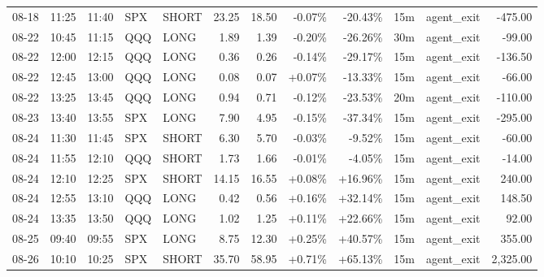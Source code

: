 \documentclass[11pt,a4paper]{article}
\begin{document}
\begin{center}
\begin{longtable}{>{\color{txtmain}}l l l l l r r r r r >{\color{txtmain}}l r}
08-18 & 11:25 & 11:40 & SPX & SHORT & 23.25 & 18.50 & \textcolor{lossred}{-0.07\%} & \textcolor{lossred}{-20.43\%} & 15m & agent\_exit & \textcolor{lossred}{-475.00} \\
08-22 & 10:45 & 11:15 & QQQ & LONG & 1.89 & 1.39 & \textcolor{lossred}{-0.20\%} & \textcolor{lossred}{-26.26\%} & 30m & agent\_exit & \textcolor{lossred}{-99.00} \\
08-22 & 12:00 & 12:15 & QQQ & LONG & 0.36 & 0.26 & \textcolor{lossred}{-0.14\%} & \textcolor{lossred}{-29.17\%} & 15m & agent\_exit & \textcolor{lossred}{-136.50} \\
08-22 & 12:45 & 13:00 & QQQ & LONG & 0.08 & 0.07 & \textcolor{wingreen}{+0.07\%} & \textcolor{lossred}{-13.33\%} & 15m & agent\_exit & \textcolor{lossred}{-66.00} \\
08-22 & 13:25 & 13:45 & QQQ & LONG & 0.94 & 0.71 & \textcolor{lossred}{-0.12\%} & \textcolor{lossred}{-23.53\%} & 20m & agent\_exit & \textcolor{lossred}{-110.00} \\
08-23 & 13:40 & 13:55 & SPX & LONG & 7.90 & 4.95 & \textcolor{lossred}{-0.15\%} & \textcolor{lossred}{-37.34\%} & 15m & agent\_exit & \textcolor{lossred}{-295.00} \\
08-24 & 11:30 & 11:45 & SPX & SHORT & 6.30 & 5.70 & \textcolor{lossred}{-0.03\%} & \textcolor{lossred}{-9.52\%} & 15m & agent\_exit & \textcolor{lossred}{-60.00} \\
08-24 & 11:55 & 12:10 & QQQ & SHORT & 1.73 & 1.66 & \textcolor{lossred}{-0.01\%} & \textcolor{lossred}{-4.05\%} & 15m & agent\_exit & \textcolor{lossred}{-14.00} \\
08-24 & 12:10 & 12:25 & SPX & SHORT & 14.15 & 16.55 & \textcolor{wingreen}{+0.08\%} & \textcolor{wingreen}{+16.96\%} & 15m & agent\_exit & \textcolor{wingreen}{240.00} \\
08-24 & 12:55 & 13:10 & QQQ & LONG & 0.42 & 0.56 & \textcolor{wingreen}{+0.16\%} & \textcolor{wingreen}{+32.14\%} & 15m & agent\_exit & \textcolor{wingreen}{148.50} \\
08-24 & 13:35 & 13:50 & QQQ & LONG & 1.02 & 1.25 & \textcolor{wingreen}{+0.11\%} & \textcolor{wingreen}{+22.66\%} & 15m & agent\_exit & \textcolor{wingreen}{92.00} \\
08-25 & 09:40 & 09:55 & SPX & LONG & 8.75 & 12.30 & \textcolor{wingreen}{+0.25\%} & \textcolor{wingreen}{+40.57\%} & 15m & agent\_exit & \textcolor{wingreen}{355.00} \\
08-26 & 10:10 & 10:25 & SPX & SHORT & 35.70 & 58.95 & \textcolor{wingreen}{+0.71\%} & \textcolor{wingreen}{+65.13\%} & 15m & agent\_exit & \textcolor{wingreen}{2,325.00} \\

\end{longtable}
\end{center}
\end{document}
